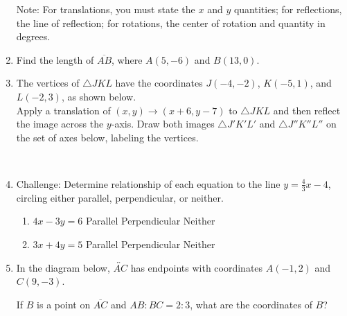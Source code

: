 \begin{enumerate}
Note: For translations, you must state the $x$ and $y$ quantities; for reflections, the line of reflection; for rotations, the center of rotation and quantity in degrees.

\item Find the length of $\overline{AB}$, where $A(5,-6)$ and $B(13,0)$.
    \vspace{4cm}

\newpage
\item The vertices of $\triangle JKL$ have the coordinates $J(-4,-2)$, $K(-5,1)$, and $L(-2,3)$, as shown below. \\[0.5cm]
Apply a translation of $(x,y) \rightarrow (x+6, y-7)$ to $\triangle JKL$ and then reflect the image across the $y$-axis. Draw both images $\triangle J'K'L'$ and $\triangle J''K''L''$ on the set of axes below, labeling the vertices.\\
  \\[1.5cm]

\item Challenge: Determine relationship of each equation to the line  $y=\frac{4}{3} x-4$, circling either parallel, perpendicular, or neither.
  \begin{enumerate}
    \item $4x-3y=6$ \hspace{1cm} Parallel \qquad Perpendicular \qquad Neither
    \vspace{1.5cm}
    \item $3x+4y=5$ \hspace{1cm} Parallel \qquad Perpendicular \qquad Neither
    \vspace{2.cm}
  \end{enumerate}

\newpage
\item In the diagram below, $\overleftrightarrow{AC}$ has endpoints with coordinates $A(-1,2)$ and $C(9, -3)$.
\begin{center} %
\end{center}
If $B$ is a point on $\overline{AC}$ and $AB {:} BC = 2{:}3$,  what  are  the  coordinates of $B$?



\end{enumerate}
